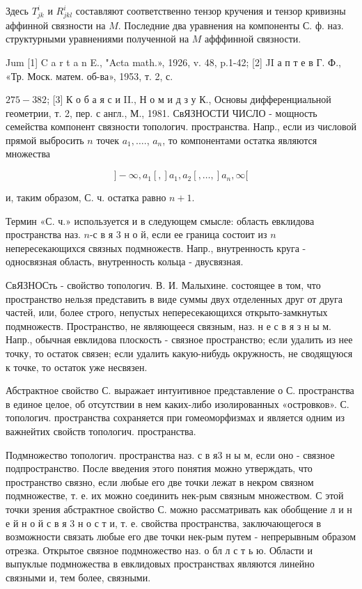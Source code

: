 \documentclass[10pt]{article}
\begin{document}
Здесь $T_{j k}^{i}$ и $R_{j k l}^{i}$ составляют соответственно тензор кручения и тензор кривизны аффинной связности на $M$. Последние два уравнения на компоненты С. ф. наз. структурными уравнениями полученной на $M$ афффинной связности.



Jum [1] C a r t a n E., "Acta math.», 1926, v. 48, p.1-42; [2] JI а п т е в Г. Ф., «Тр. Моск. матем. об-ва», 1953, т. 2, с.

$275-382$; [3] К о б а я с и II., Н о м и д з у К., Основы дифференциальной геометрии, т. 2, пер. с англ., М., 1981. СвЯЗНОСТИ ЧИСЛО - мощность семейства компонент связности топологич. пространства. Напр., если из числовой прямой выбросить $n$ точек $a_{1}, \ldots .$, $a_{n}$, то компонентами остатка являются множества



\[

]-\infty, a_{1}[,] a_{1}, a_{2}[, \ldots,] a_{n}, \infty[

\]



и, таким образом, С. ч. остатка равно $n+1$.



Термин «С. ч.» используется и в следующем смысле: область евклидова пространства наз. $n$-с в я 3 н о й, если ее граница состоит из $n$ непересекающихся связных подмножеств. Напр., внутренность круга - односвязная область, внутренность кольца - двусвязная.



СвЯЗНОСть - свойство топологич. В. И. Малыхине. состоящее в том, что пространство нельзя представить в виде суммы двух отделенных друг от друга частей, или, более строго, непустых непересекающихся открыто-замкнутых подмножеств. Пространство, не являющееся связным, наз. н е с в я з н ы м. Напр., обычная евклидова плоскость - связное пространство; если удалить из нее точку, то остаток связен; если удалить какую-нибудь окружность, не сводящуюся к точке, то остаток уже несвязен.



Абстрактное свойство С. выражает интуитивное представление о С. пространства в единое целое, об отсутствии в нем каких-либо изолированных «островков». С. топологич. пространства сохраняется при гомеоморфизмах и является одним из важнейтих свойств топологич. пространства.



Подмножество топологич. пространства наз. с в я3 н ы м, если оно - связное подпространство. После введения этого понятия можно утверждать, что пространство связно, если любые его две точки лежат в некром связном подмножестве, т. е. их можно соединить нек-рым связным множеством. С этой точки зрения абстрактное свойство С. можно рассматривать как обобщение л и н е й н о й с в я 3 н о с т и, т. е. свойства пространства, заключающегося в возможности связать любые его две точки нек-рым путем - непрерывным образом отрезка. Открытое связное подмножество наз. о бл л с т ь ю. Области и выпуклые подмножества в евклидовых пространствах являются линейно связными и, тем более, связными.
\end{document}
